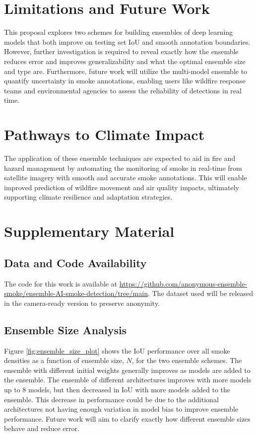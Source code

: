 \documentclass{article}
\begin{document}
\section{Limitations and Future Work} This proposal explores two schemes for building ensembles of deep learning models that both improve on testing set IoU and smooth annotation boundaries. However, further investigation is required to reveal exactly how the ensemble reduces error and improves generalizability and what the optimal ensemble size and type are. Furthermore, future work will utilize the multi-model ensemble to quantify uncertainty in smoke annotations, enabling users like wildfire response teams and environmental agencies to assess the reliability of detections in real time. 

\section{Pathways to Climate Impact} The application of these ensemble techniques are expected to aid in fire and hazard management by automating the monitoring of smoke in real-time from satellite imagery with smooth and accurate smoke annotations. This will enable improved prediction of wildfire movement and air quality impacts, ultimately supporting climate resilience and adaptation strategies.  


 

\section{Supplementary Material}
\subsection{Data and Code Availability} The code for this work is available at \url{https://github.com/anonymous-ensemble-smoke/ensemble-AI-smoke-detection/tree/main}. The dataset used will be released in the camera-ready version to preserve anonymity.

\subsection{Ensemble Size Analysis} Figure \ref{fig:ensemble_size_plot} shows the IoU performance over all smoke densities as a function of ensemble size, $N$, for the two ensemble schemes. The ensemble with different initial weights generally improves as models are added to the ensemble. The ensemble of different architectures improves with more models up to 8 models, but then decreased in IoU with more models added to the ensemble. This decrease in performance could be due to the additional architectures not having enough variation in model bias to improve ensemble performance. Future work will aim to clarify exactly how different ensemble sizes behave and reduce error. 
\end{document}
